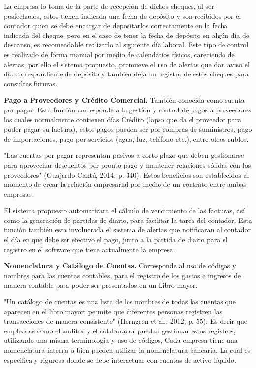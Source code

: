 La empresa lo toma de la parte de recepción de dichos cheques, al ser posfechados, estos tienen indicada una fecha de depósito y son recibidos por el contador quien se debe encargar de depositarlos correctamente en la fecha indicada del cheque, pero en el caso de tener la fecha de depósito en algún día de descanso, es recomendable realizarlo al siguiente día laboral. Este tipo de control es realizado de forma manual por medio de calendarios físicos, careciendo de alertas, por ello el sistema propuesto, promueve el uso de alertas que dan aviso el día correspondiente de depósito y también deja un registro de estos cheques para consultas futuras.

\textbf{Pago a Proveedores y Crédito Comercial.} También conocida como cuenta por pagar. Esta función corresponde a la gestión y control de pagos a proveedores los cuales normalmente contienen días Crédito (lapso que da el proveedor para poder pagar su factura), estos pagos pueden ser por compras de suministros, pago de importaciones, pago por servicios (agua, luz, teléfono etc.), entre otros rublos.

"Las cuentas por pagar representan pasivos a corto plazo que deben gestionarse para aprovechar descuentos por pronto pago y mantener relaciones sólidas con los proveedores" (Guajardo Cantú, 2014, p. 340). Estos beneficios son establecidos al momento de crear la relación empresarial por medio de un contrato entre ambas empresas.

El sistema propuesto automatizara el cálculo de vencimiento de las facturas, así como la generación de partidas de diario, para facilitar la tarea del contador. Esta función también esta involucrada el sistema de alertas que notificaran al contador el día en que debe ser efectivo el pago, junto a la partida de diario para el registro en el software que tiene actualmente la empresa.

\textbf{Nomenclatura y Catálogo de Cuentas.} Corresponde al uso de códigos y nombres para las cuentas contables, para el registro de los gastos e ingresos de manera contable para poder ser presentados en un Libro mayor.

"Un catálogo de cuentas es una lista de los nombres de todas las cuentas que aparecen en el libro mayor; permite que diferentes personas registren las transacciones de manera consistente" (Horngren et al., 2012, p. 55). Es decir que empleados como el auditor y el colaborador puedan gestionar estos registros, utilizando una misma terminología y uso de códigos, Cada empresa tiene una nomenclatura interna o bien pueden utilizar la nomenclatura bancaria, La cual es especifica y rigurosa donde se debe interactuar con cuentas de activo líquido.


